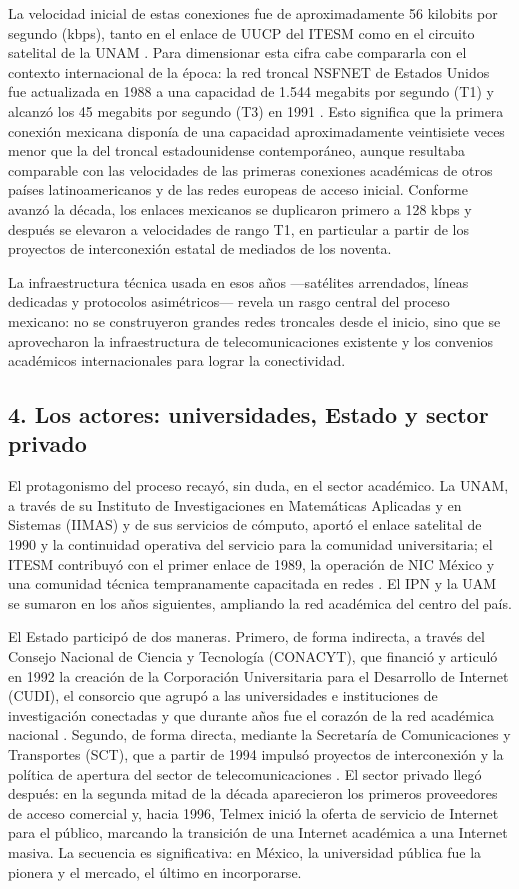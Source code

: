 \documentclass[11pt,a4paper]{article}
\begin{document}
La velocidad inicial de estas conexiones fue de aproximadamente 56 kilobits
por segundo (kbps), tanto en el enlace de UUCP del ITESM como en el circuito
satelital de la UNAM \cite{tec,unam}. Para
dimensionar esta cifra cabe compararla con el contexto internacional de la
época: la red troncal NSFNET de Estados Unidos fue actualizada en 1988 a una
capacidad de 1.544 megabits por segundo (T1) y alcanzó los 45 megabits por
segundo (T3) en 1991 \cite{abbate}. Esto significa que la primera conexión
mexicana disponía de una capacidad aproximadamente veintisiete veces menor que
la del troncal estadounidense contemporáneo, aunque resultaba comparable con
las velocidades de las primeras conexiones académicas de otros países
latinoamericanos y de las redes europeas de acceso inicial. Conforme avanzó la
década, los enlaces mexicanos se duplicaron primero a 128 kbps y después se
elevaron a velocidades de rango T1, en particular a partir de los proyectos
de interconexión estatal de mediados de los noventa.

La infraestructura técnica usada en esos años —satélites arrendados, líneas
dedicadas y protocolos asimétricos— revela un rasgo central del proceso
mexicano: no se construyeron grandes redes troncales desde el inicio, sino que
se aprovecharon la infraestructura de telecomunicaciones existente y los
convenios académicos internacionales para lograr la conectividad.

\subsection*{4. Los actores: universidades, Estado y sector privado}

El protagonismo del proceso recayó, sin duda, en el sector académico. La UNAM,
a través de su Instituto de Investigaciones en Matemáticas Aplicadas y en
Sistemas (IIMAS) y de sus servicios de cómputo, aportó el enlace satelital de
1990 y la continuidad operativa del servicio para la comunidad universitaria;
el ITESM contribuyó con el primer enlace de 1989, la operación de NIC México
y una comunidad técnica tempranamente capacitada en redes \cite{tec,nic}. El IPN y la UAM se sumaron en los años
siguientes, ampliando la red académica del centro del país.

El Estado participó de dos maneras. Primero, de forma indirecta, a través del
Consejo Nacional de Ciencia y Tecnología (CONACYT), que financió y articuló en
1992 la creación de la Corporación Universitaria para el Desarrollo de
Internet (CUDI), el consorcio que agrupó a las universidades e instituciones
de investigación conectadas y que durante años fue el corazón de la red
académica nacional \cite{cudi}. Segundo, de forma directa, mediante la
Secretaría de Comunicaciones y Transportes (SCT), que a partir de 1994 impulsó
proyectos de interconexión y la política de apertura del sector de
telecomunicaciones \cite{sct}. El sector privado llegó después: en la
segunda mitad de la década aparecieron los primeros proveedores de acceso
comercial y, hacia 1996, Telmex inició la oferta de servicio de Internet para
el público, marcando la transición de una Internet académica a una Internet
masiva. La secuencia es significativa: en México, la universidad pública fue
la pionera y el mercado, el último en incorporarse.
\end{document}
